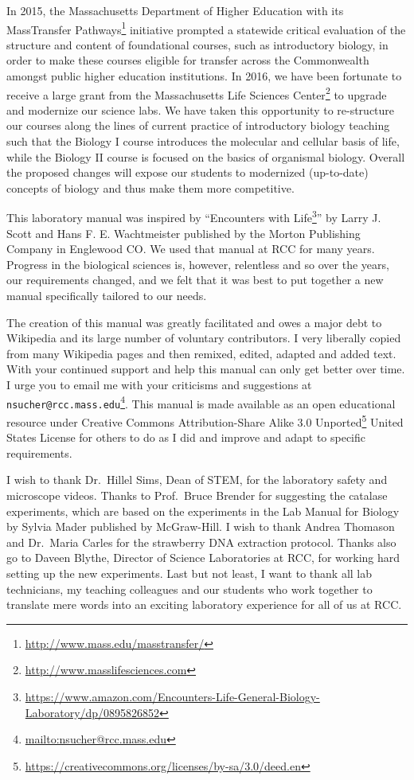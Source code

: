 \documentclass[]{book}
\let\rmarkdownfootnote\footnote%
\def\footnote{\protect\rmarkdownfootnote}
\renewcommand{\href}[2]{#2\footnote{\url{#1}}}
\theoremstyle{definition}
\theoremstyle{definition}
\theoremstyle{definition}
\theoremstyle{remark}
\begin{document}
In 2015, the Massachusetts Department of Higher Education with its
\href{http://www.mass.edu/masstransfer/}{MassTransfer Pathways}
initiative prompted a statewide critical evaluation of the structure and
content of foundational courses, such as introductory biology, in order
to make these courses eligible for transfer across the Commonwealth
amongst public higher education institutions. In 2016, we have been
fortunate to receive a large grant from the
\href{http://www.masslifesciences.com}{Massachusetts Life Sciences
Center} to upgrade and modernize our science labs. We have taken this
opportunity to re-structure our courses along the lines of current
practice of introductory biology teaching such that the Biology I course
introduces the molecular and cellular basis of life, while the Biology
II course is focused on the basics of organismal biology. Overall the
proposed changes will expose our students to modernized (up-to-date)
concepts of biology and thus make them more competitive.

This laboratory manual was inspired by
``\href{https://www.amazon.com/Encounters-Life-General-Biology-Laboratory/dp/0895826852}{Encounters
with Life}'' by Larry J. Scott and Hans F. E. Wachtmeister published by
the Morton Publishing Company in Englewood CO. We used that manual at
RCC for many years. Progress in the biological sciences is, however,
relentless and so over the years, our requirements changed, and we felt
that it was best to put together a new manual specifically tailored to
our needs.

The creation of this manual was greatly facilitated and owes a major
debt to Wikipedia and its large number of voluntary contributors. I very
liberally copied from many Wikipedia pages and then remixed, edited,
adapted and added text. With your continued support and help this manual
can only get better over time. I urge you to email me with your
criticisms and suggestions at
\href{mailto:nsucher@rcc.mass.edu}{\nolinkurl{nsucher@rcc.mass.edu}}.
This manual is made available as an open educational resource under
\href{https://creativecommons.org/licenses/by-sa/3.0/deed.en}{Creative
Commons Attribution-Share Alike 3.0 Unported} United States License for
others to do as I did and improve and adapt to specific requirements.

I wish to thank Dr.~Hillel Sims, Dean of STEM, for the laboratory safety
and microscope videos. Thanks to Prof.~Bruce Brender for suggesting the
catalase experiments, which are based on the experiments in the Lab
Manual for Biology by Sylvia Mader published by McGraw-Hill. I wish to
thank Andrea Thomason and Dr.~Maria Carles for the strawberry DNA
extraction protocol. Thanks also go to Daveen Blythe, Director of
Science Laboratories at RCC, for working hard setting up the new
experiments. Last but not least, I want to thank all lab technicians, my
teaching colleagues and our students who work together to translate mere
words into an exciting laboratory experience for all of us at RCC.
\end{document}
